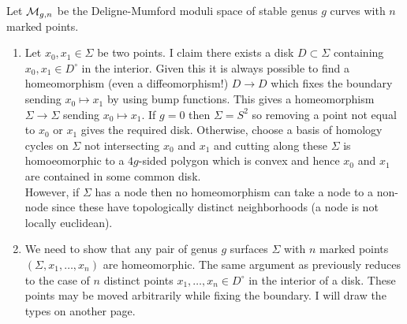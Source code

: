 \documentclass[12pt]{article}
\begin{document}
Let $\mathcal{M}_{g,n}$ be the Deligne-Mumford moduli space of stable genus $g$ curves with $n$ marked points.

\newcommand{\h}{\mathbb{h}}

\begin{enumerate}
\item Let $x_0, x_1 \in \Sigma$ be two points. I claim there exists a disk $D \subset \Sigma$ containing $x_0, x_1 \in D^\circ$ in the interior. Given this it is always possible to find a homeomorphism (even a diffeomorphism!) $D \to D$ which fixes the boundary sending $x_0 \mapsto x_1$ by using bump functions. This gives a homeomorphism $\Sigma \to \Sigma$ sending $x_0 \mapsto x_1$. If $g = 0$ then $\Sigma = S^2$ so removing a point not equal to $x_0$ or $x_1$ gives the required disk. Otherwise, choose a basis of homology cycles on $\Sigma$ not intersecting $x_0$ and $x_1$ and cutting along these $\Sigma$ is homoeomorphic to a $4g$-sided polygon which is convex and hence $x_0$ and $x_1$ are contained in some common disk.
\bigskip\\
However, if $\Sigma$ has a node then no homeomorphism can take a node to a non-node since these have topologically distinct neighborhoods (a node is not locally euclidean). 

\item We need to show that any pair of genus $g$ surfaces $\Sigma$ with $n$ marked points $(\Sigma, x_1, \dots, x_n)$ are homeomorphic. The same argument as previously reduces to the case of $n$ distinct points $x_1, \dots, x_n \in D^\circ$ in the interior of a disk. These points may be moved arbitrarily while fixing the boundary. I will draw the types on another page.


\end{enumerate}
\end{document}
